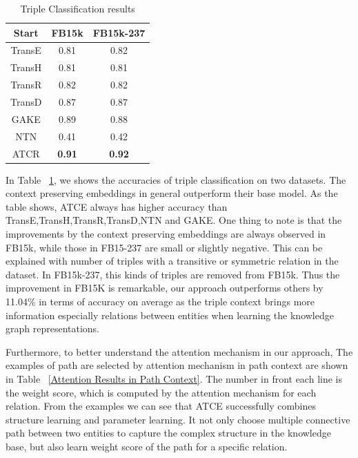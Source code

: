 \begin{table}
 \centering
 \caption{Triple Classification results}
  \label{Triple Classification_results}
\begin{tabular}{c|c|c}
  \hline
  Start & FB15k  & FB15k-237 \\
  \hline
  TransE & 0.81 & 0.82 \\
  TransH & 0.81 & 0.81 \\
  TransR & 0.82 & 0.82 \\
  TransD & 0.87 & 0.87 \\
  GAKE & 0.89 & 0.88 \\
  NTN & 0.41 & 0.42 \\
  \hline
  ATCR & \textbf{0.91} & \textbf{0.92} \\
  \hline
\end{tabular}
\end{table}
In Table ~\ref{Triple Classification_results}, we shows the accuracies of triple classification on two datasets. The context preserving embeddings in general outperform their base model. As the table shows, ATCE always has higher accuracy than TransE,TransH,TransR,TransD,NTN and GAKE. One thing to note is that the improvements by the context preserving embeddings are always observed in FB15k, while those in FB15-237 are small or slightly negative. This can be explained with number of triples with a transitive or symmetric relation in the dataset. In FB15k-237, this kinds of triples are removed from FB15k. Thus the improvement in FB15K is remarkable, our approach outperforms others by 11.04\% in terms of accuracy on average as the triple context brings more information especially relations between entities when learning the knowledge graph representations.

Furthermore, to better understand the attention mechanism in our approach, The examples of path are selected by attention mechanism in path context are shown in Table ~\ref{Attention Results in Path Context}. The number in front each line is the weight score, which is computed by the attention mechanism for each relation. From the examples we can see that ATCE successfully combines structure learning and parameter learning. It not only choose multiple connective path between two entities to capture the complex structure in the knowledge base, but also learn weight score of the path for a specific relation.

